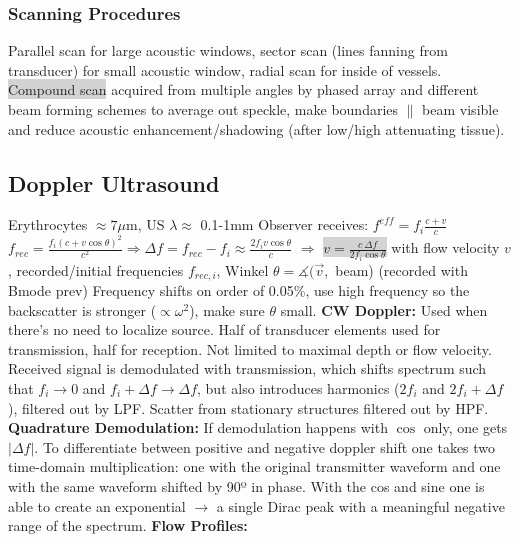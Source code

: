 \documentclass[9pt]{article}
\newcommand{\grey}[1]{\setlength{\fboxsep}{0pt}\colorbox{lightgrey}{#1}}
\begin{document}
\begin{multicols}{2}
\subsubsection{Scanning Procedures}
Parallel scan for large acoustic windows, sector scan (lines fanning from transducer) for small acoustic window, radial scan for inside of vessels. \grey{Compound scan} acquired from multiple angles by phased array and different beam forming schemes to average out speckle, make boundaries $\parallel$ beam visible and reduce acoustic enhancement/shadowing (after low/high attenuating tissue).

\subsection{Doppler Ultrasound}
Erythrocytes $\approx 7\mu$m, US $\lambda \approx$ 0.1-1mm
Observer receives: $f^{eff}=f_i\frac{c+v}{c}$\\
$f_{rec} = \frac{f_i (c + v\cos\theta)^2}{c^2} \Rightarrow \Delta f = f_{rec} - f_i \approx \frac{2 f_i v \cos\theta}{c}$ 
$\Rightarrow$ \grey{$v = \frac{c \: \Delta f}{2 f_i \cos\theta}$} with flow velocity $v$, recorded/initial frequencies $f_{rec,i}$, Winkel $\theta = \measuredangle(\vec v,$ beam)
(recorded with Bmode prev)
Frequency shifts on order of 0.05\%, use high frequency so the backscatter is stronger ($\propto \omega^2$), make sure $\theta$ small. \textbf{CW Doppler:}
Used when there's no need to localize source. Half of transducer elements used for transmission, half for reception. Not limited to maximal depth or flow velocity. Received signal is demodulated with transmission, which shifts spectrum such that $f_i \rightarrow 0$ and $f_i + \Delta f \rightarrow \Delta f$, but also introduces harmonics ($2f_i$ and $2f_i + \Delta f$), filtered out by LPF. Scatter from stationary structures filtered out by HPF.  \textbf{Quadrature Demodulation:}
If demodulation happens with $\cos$ only, one gets $|\Delta f|$. To differentiate between positive and negative doppler shift one takes two time-domain multiplication: one with the original transmitter waveform and one with the same waveform shifted by 90º in phase. With the cos and sine one is able to create an exponential $\rightarrow$ a single Dirac peak with a meaningful negative range of the spectrum. \textbf{Flow Profiles:}

\end{multicols}
\end{document}
